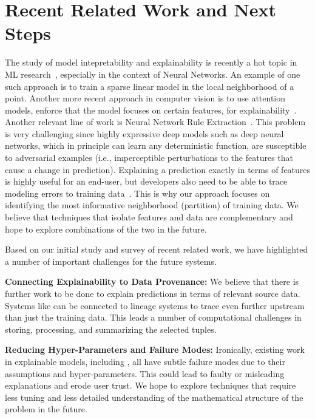 \section{Recent Related Work and Next Steps}
The study of model intepretability and explainability is recently a hot topic in ML research~\cite{taylor2016alignment, lei2016rationalizing, ribeiro2016should}, especially in the context of Neural Networks. 
An example of one such approach is to train a sparse linear model in the local neighborhood of a point\cite{lei2016rationalizing}.
Another more recent approach in computer vision is to use attention models, enforce that the model focuses on certain features, for explainability~\cite{kim2017interpretable}.
Another relevant line of work is Neural Network Rule Extraction~\cite{hailesilassie2016rule}.
This problem is very challenging since highly expressive deep models such as deep neural networks, which in principle can learn any deterministic function, are susceptible to adversarial examples (i.e., imperceptible perturbations to the features that cause a change in prediction)\cite{szegedy2013intriguing}.
Explaining a prediction exactly in terms of features is highly useful for an end-user, but developers also need to be able to trace modeling errors to training data~\cite{DBLP:journals/pvldb/KrishnanWWFG16}.
This is why our approach focuses on identifying the most informative neighborhood (partition) of training data.
We believe that techniques that isolate features and data are complementary and hope to explore combinations of the two in the future.

Based on our initial study and survey of recent related work, we have highlighted a number of important challenges for the future systems.

\vspace{0.5em}\noindent\textbf{Connecting Explainability to Data Provenance: } We believe that there is further work to be done to explain predictions in terms of relevant source data. Systems like \sys can be connected to lineage systems to trace even further upstream than just the training data. This leads a number of computational challenges in storing, processing, and summarizing the selected tuples.

\vspace{0.5em}\noindent\textbf{Reducing Hyper-Parameters and Failure Modes: } Ironically, existing work in explainable models, including \sys, all have subtle failure modes due to their assumptions and hyper-parameters. This could lead to faulty or misleading explanations and erode user trust. We hope to explore techniques that require less tuning and less detailed understanding of the mathematical structure of the problem in the future.

